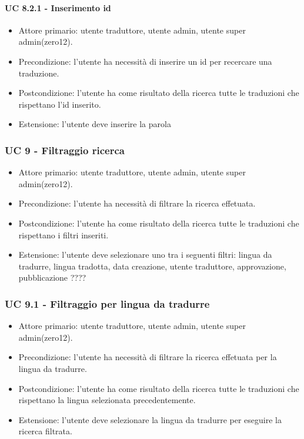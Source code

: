         \paragraph*{UC 8.2.1 - Inserimento id}
            \begin{itemize}
                \item Attore primario: utente traduttore, utente admin, utente super admin(zero12).
                \item Precondizione: l'utente ha necessità di inserire un id per recercare una traduzione.
                \item Postcondizione: l'utente ha come risultato della ricerca tutte le traduzioni che rispettano l'id inserito.
                \item Estensione: l'utente deve inserire la parola
            \end{itemize}
\subsubsection*{UC 9 - Filtraggio ricerca}
    \begin{itemize}
        \item Attore primario: utente traduttore, utente admin, utente super admin(zero12).
        \item Precondizione: l'utente ha necessità di filtrare la ricerca effetuata.
        \item Postcondizione: l'utente ha come risultato della ricerca tutte le traduzioni che rispettano i filtri inseriti.
        \item Estensione: l'utente deve selezionare uno tra i seguenti filtri: lingua da tradurre, lingua tradotta, data creazione, utente traduttore, approvazione, pubblicazione  ????
    \end{itemize}
    \subsubsection*{UC 9.1 - Filtraggio per lingua da tradurre}
        \begin{itemize}
            \item Attore primario: utente traduttore, utente admin, utente super admin(zero12).
            \item Precondizione: l'utente ha necessità di filtrare la ricerca effetuata per la lingua da tradurre.
            \item Postcondizione: l'utente ha come risultato della ricerca tutte le traduzioni che rispettano la lingua selezionata precedentemente. 
            \item Estensione: l'utente deve selezionare la lingua da tradurre per eseguire la ricerca filtrata.
        \end{itemize}        
